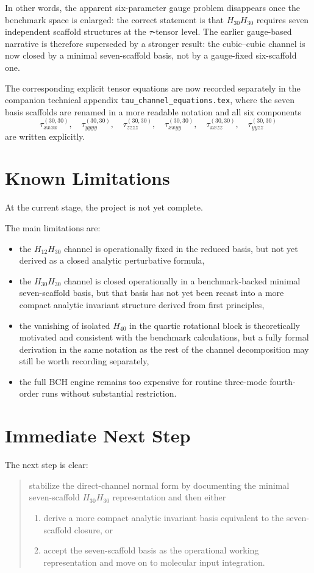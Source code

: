 \documentclass[11pt,a4paper]{article}
\begin{document}
In other words, the apparent six-parameter gauge problem disappears once the benchmark space is enlarged: the correct statement is that \(H_{30}H_{30}\) requires seven independent scaffold structures at the \(\tau\)-tensor level. The earlier gauge-based narrative is therefore superseded by a stronger result: the cubic--cubic channel is now closed by a minimal seven-scaffold basis, not by a gauge-fixed six-scaffold one.

The corresponding explicit tensor equations are now recorded separately in the companion technical appendix
\texttt{tau\_channel\_equations.tex},
where the seven basis scaffolds are renamed in a more readable notation and all six components
\[
\tau^{(30,30)}_{xxxx},\quad
\tau^{(30,30)}_{yyyy},\quad
\tau^{(30,30)}_{zzzz},\quad
\tau^{(30,30)}_{xxyy},\quad
\tau^{(30,30)}_{xxzz},\quad
\tau^{(30,30)}_{yyzz}
\]
are written explicitly.

\section{Known Limitations}
At the current stage, the project is not yet complete.

The main limitations are:
\begin{itemize}[leftmargin=*]
\item the \(H_{12}H_{30}\) channel is operationally fixed in the reduced basis, but not yet derived as a closed analytic perturbative formula,
\item the \(H_{30}H_{30}\) channel is closed operationally in a benchmark-backed minimal seven-scaffold basis, but that basis has not yet been recast into a more compact analytic invariant structure derived from first principles,
\item the vanishing of isolated \(H_{40}\) in the quartic rotational block is theoretically motivated and consistent with the benchmark calculations, but a fully formal derivation in the same notation as the rest of the channel decomposition may still be worth recording separately,
\item the full BCH engine remains too expensive for routine three-mode fourth-order runs without substantial restriction.
\end{itemize}

\section{Immediate Next Step}
The next step is clear:
\begin{quote}
stabilize the direct-channel normal form by documenting the minimal seven-scaffold \(H_{30}H_{30}\) representation and then either
\begin{enumerate}[leftmargin=*]
\item derive a more compact analytic invariant basis equivalent to the seven-scaffold closure, or
\item accept the seven-scaffold basis as the operational working representation and move on to molecular input integration.
\end{enumerate}
\end{quote}
\end{document}
